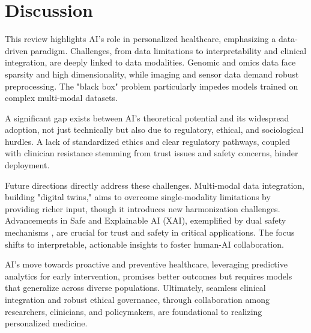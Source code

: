 \documentclass[runningheads]{llncs}
\begin{document}
\section{Discussion}
This review highlights AI's role in personalized healthcare, emphasizing a data-driven paradigm. Challenges, from data limitations to interpretability and clinical integration, are deeply linked to data modalities. Genomic and omics data face sparsity and high dimensionality, while imaging and sensor data demand robust preprocessing. The "black box" problem particularly impedes models trained on complex multi-modal datasets.

A significant gap exists between AI's theoretical potential and its widespread adoption, not just technically but also due to regulatory, ethical, and sociological hurdles. A lack of standardized ethics and clear regulatory pathways, coupled with clinician resistance stemming from trust issues and safety concerns, hinder deployment.

Future directions directly address these challenges. Multi-modal data integration, building "digital twins," aims to overcome single-modality limitations by providing richer input, though it introduces new harmonization challenges. Advancements in Safe and Explainable AI (XAI), exemplified by dual safety mechanisms \cite{article_22}, are crucial for trust and safety in critical applications. The focus shifts to interpretable, actionable insights to foster human-AI collaboration.

AI's move towards proactive and preventive healthcare, leveraging predictive analytics for early intervention, promises better outcomes but requires models that generalize across diverse populations. Ultimately, seamless clinical integration and robust ethical governance, through collaboration among researchers, clinicians, and policymakers, are foundational to realizing personalized medicine.
\end{document}
